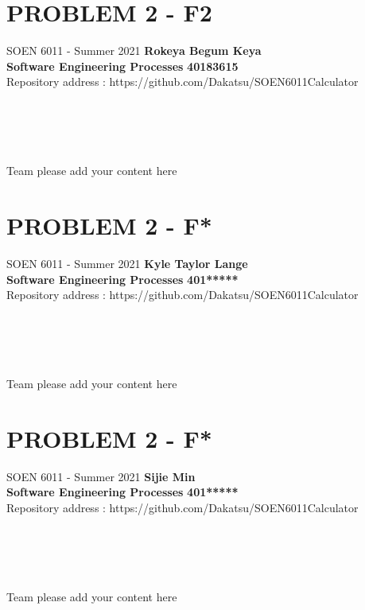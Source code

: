 \documentclass[a4paper, 11pt]{report}
\begin{document}
\noindent
\section*{PROBLEM 2 - F2}
\normalsize {SOEN 6011 - Summer 2021} \hfill \textbf{Rokeya Begum Keya} \\
\textbf{ Software Engineering Processes}  \hfill \textbf{40183615} \\
\hfill Repository address : https://github.com/Dakatsu/SOEN6011Calculator
\\\\\\\\\\
 \begin{center} Team please add your content here \end{center}
\pagebreak

\section*{PROBLEM 2 - F*}
\normalsize {SOEN 6011 - Summer 2021} \hfill \textbf{Kyle Taylor Lange} \\
\textbf{ Software Engineering Processes}  \hfill \textbf{401*****} \\
\hfill Repository address : https://github.com/Dakatsu/SOEN6011Calculator
\\\\\\\\\\
 \begin{center} Team please add your content here \end{center}
\pagebreak

\section*{PROBLEM 2 - F*}
\normalsize {SOEN 6011 - Summer 2021} \hfill \textbf{Sijie Min} \\
\textbf{ Software Engineering Processes}  \hfill \textbf{401*****} \\
\hfill Repository address : https://github.com/Dakatsu/SOEN6011Calculator
\\\\\\\\\\
 \begin{center} Team please add your content here \end{center}
\pagebreak
\end{document}
